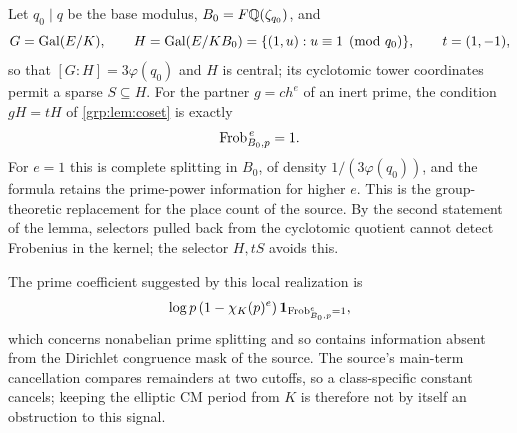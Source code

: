Let $q_0\mid q$ be the base modulus, $B_0=F\mathbb{Q}(\zeta_{q_0})$, and
\[
 G=\operatorname{Gal}(E/K),\qquad H=\operatorname{Gal}(E/KB_0)=\{(1,u):u\equiv1\pmod{q_0}\},
 \qquad t=(1,-1),
\]
so that $[G:H]=3\varphi(q_0)$ and $H$ is central; its cyclotomic tower
coordinates permit a sparse $S\subseteq H$. For the partner $g=ch^e$ of an
inert prime, the condition $gH=tH$ of \cref{grp:lem:coset} is exactly
\begin{equation}\label{grp:eq:selector}
 \operatorname{Frob}_{B_0,p}^{\,e}=1 .
\end{equation}
For $e=1$ this is complete splitting in $B_0$, of density
$1/(3\varphi(q_0))$, and the formula retains the prime-power information for
higher $e$. This is the group-theoretic replacement for the place count
 of the source. By the second statement of the
lemma, selectors pulled back from the cyclotomic quotient cannot detect
Frobenius in the kernel; the selector $H,tS$ avoids this.


The prime coefficient suggested by this local realization is
\[
 \log p\,(1-\chi_K(p)^e)\,\mathbf{1}_{\operatorname{Frob}_{B_0,p}^{e}=1},
\]
which concerns nonabelian prime splitting and so contains information absent
from the Dirichlet congruence mask of the source. The source's main-term
cancellation compares remainders at two cutoffs, so a class-specific constant
cancels; keeping the elliptic CM period from $K$ is therefore not by itself an
obstruction to this signal.

